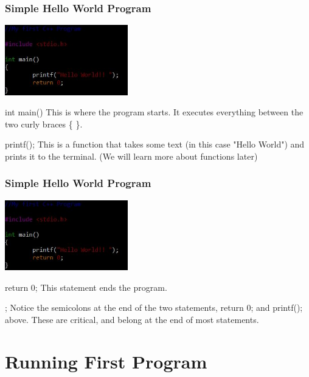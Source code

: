 \documentclass{if-beamer}
\begin{document}
\begin{frame}
\frametitle{Simple Hello World Program}
\includegraphics[width = 0.4\textwidth]{figures/HelloWorld.jpg}
\begin{block}{int main()}
This is where the program starts. It executes everything between the two curly braces \{ \}.
\end{block}
\begin{block}{printf();}
	\vspace{4pt} This is a function that takes some text (in this case "Hello World") and prints it to the terminal. \tiny (We will learn more about functions later)
\end{block}

\end{frame}


\begin{frame}
\frametitle{Simple Hello World Program}
\includegraphics[width = 0.4\textwidth]{figures/HelloWorld.jpg}
\begin{block}{return 0;}
	This statement ends the program.
\end{block}
\begin{block}{;}
	Notice the semicolons at the end of the two statements, return 0; and printf(); above. These are critical, and belong at the end of most statements.
\end{block}

\end{frame}


\section{Running First Program}
\end{document}

